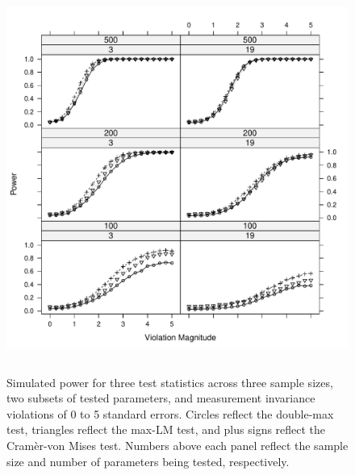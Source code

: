 \documentclass[man]{apa}
\begin{document}
\begin{figure}
\caption{Simulated power for three test statistics across three sample
  sizes, two subsets of tested parameters, and measurement invariance
  violations of 0 to 5 standard 
  errors.  Circles reflect the double-max test, triangles reflect the
  max-LM test, and plus signs reflect the Cram\`{e}r-von Mises test.
  Numbers above each panel reflect the sample size and number of
  parameters being tested, respectively.}
\label{fig:simres}
\includegraphics[height=5in]{simres.pdf}
\end{figure}
\end{document}
